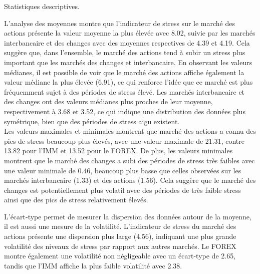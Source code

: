 \begin{table}[H]
    \centering
    \sffamily
    \scalebox{0.9}{}
    \caption{Statistiques descriptives.}
    \label{fig:statsdescriptives}
\end{table}

L'analyse des moyennes montre que l'indicateur de stress sur le marché des actions  présente la valeur moyenne la plus élevée avec 8.02, suivie par les marchés interbancaire et des changes avec des moyennes respectives de 4.39 et 4.19. Cela suggère que, dans l'ensemble, le marché des actions tend à subir un stress plus important que les marchés des changes et interbancaire. En observant les valeurs médianes, il est possible de voir que le marché des actions affiche également la valeur médiane la plus élevée (6.91), ce qui renforce l'idée que ce marché est plus fréquemment sujet à des périodes de stress élevé. Les marchés interbancaire et des changes ont des valeurs médianes plus proches de leur moyenne, respectivement à 3.68 et 3.52, ce qui indique une distribution des données plus symétrique, bien que des périodes de stress aigu existent.\\

Les valeurs maximales et minimales montrent que marché des actions a connu des pics de stress beaucoup plus élevés, avec une valeur maximale de 21.31, contre 13.82 pour l'IMM et 13.52 pour le FOREX. De plus, les valeurs minimales montrent que le marché des changes a subi des périodes de stress très faibles avec une valeur minimale de 0.46, beaucoup plus basse que celles observées sur les marchés interbancaire (1.33) et des actions (1.56). Cela suggère que le marché des changes est potentiellement plus volatil avec des périodes de très faible stress ainsi que des pics de stress relativement élevés.

\newpage

L'écart-type permet de mesurer la dispersion des données autour de la moyenne, il est aussi une mesure de la volatilité. L'indicateur de stress du marché des actions présente une dispersion plus large (4.56), indiquant une plus grande volatilité des niveaux de stress par rapport aux autres marchés. Le FOREX montre également une volatilité non négligeable avec un écart-type de 2.65, tandis que l'IMM affiche la plus faible volatilité avec 2.38.\\

